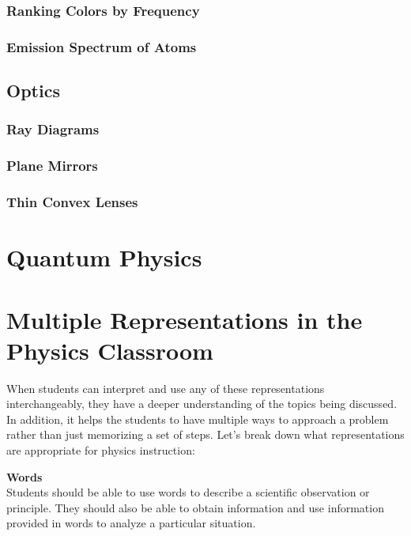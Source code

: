 \documentclass[dvipsnames]{article}
\newif\ifShowUnitXII                             %
\begin{document}
\subsubsection{Ranking Colors by Frequency}
\subsubsection{Emission Spectrum of Atoms}

\subsection{Optics}

\subsubsection{Ray Diagrams}
\subsubsection{Plane Mirrors}
\subsubsection{Thin Convex Lenses}
\fi

\clearpage

\section{Quantum Physics}

\ifShowUnitXII

Quantum stuff goes here.

\fi

\clearpage

\section*{Multiple Representations in the Physics Classroom}

When students can interpret and use any of these representations interchangeably, they have a deeper understanding of the topics being discussed.  In addition, it helps the students to have multiple ways to approach a problem rather than just memorizing a set of steps.  Let’s break down what representations are appropriate for physics instruction:

\textbf{Words}\\
Students should be able to use words to describe a scientific observation or principle.  They should also be able to obtain information and use information provided in words to analyze a particular situation.
\end{document}
